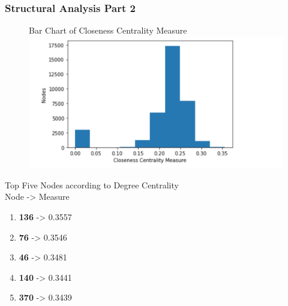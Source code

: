 \documentclass{beamer}
\begin{document}
\begin{frame}
\frametitle{Structural Analysis Part 2}
	\begin{multicols}{2}
		\begin{figure}
	        {\tiny Bar Chart of Closeness Centrality Measure}
		\includegraphics[width=\columnwidth]{close-cent.png}
		\end{figure}
		\columnbreak
		{\tiny Top Five Nodes according to Degree Centrality} \\
		Node  ->  Measure
		\begin{enumerate} 
		\item \textbf{136} -> 0.3557
		\item \textbf{76} -> 0.3546
		\item \textbf{46} -> 0.3481
		\item \textbf{140} -> 0.3441
		\item \textbf{370} -> 0.3439
		\end{enumerate} 
	\end{multicols}
\end{frame}
\end{document}
